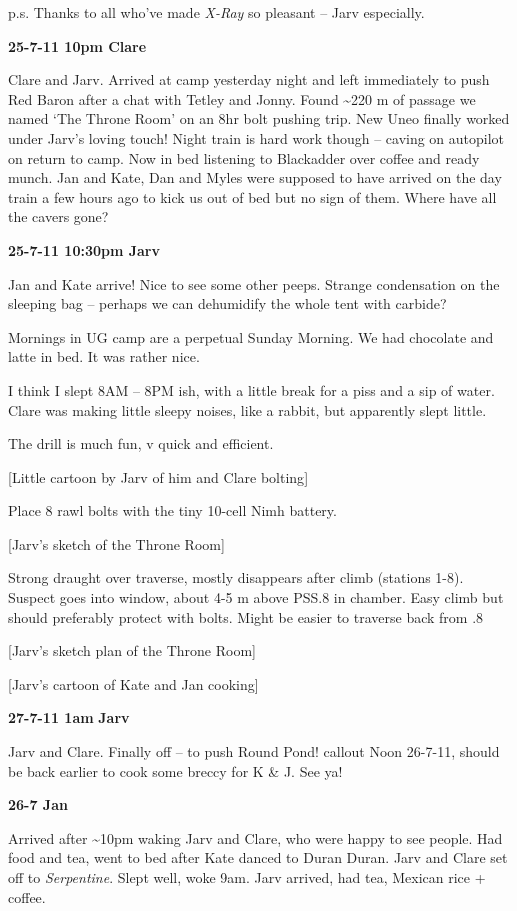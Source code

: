 p.s. Thanks to all who've made \emph{X-Ray} so pleasant -- Jarv
especially.

\textbf{25-7-11 10pm Clare}

Clare and Jarv. Arrived at camp yesterday night and left immediately to
push Red Baron after a chat with Tetley and Jonny. Found
\textasciitilde 220 m of passage we named `The Throne Room' on an 8hr
bolt pushing trip. New Uneo finally worked under Jarv's loving touch!
Night train is hard work though -- caving on autopilot on return to
camp. Now in bed listening to Blackadder over coffee and ready munch.
Jan and Kate, Dan and Myles were supposed to have arrived on the day
train a few hours ago to kick us out of bed but no sign of them. Where
have all the cavers gone?

\textbf{25-7-11 10:30pm Jarv}

Jan and Kate arrive! Nice to see some other peeps. Strange condensation
on the sleeping bag -- perhaps we can dehumidify the whole tent with
carbide?

Mornings in UG camp are a perpetual Sunday Morning. We had chocolate and
latte in bed. It was rather nice.

I think I slept 8AM -- 8PM ish, with a little break for a piss and a sip
of water. Clare was making little sleepy noises, like a rabbit, but
apparently slept little.

The drill is much fun, v quick and efficient.

{[}Little cartoon by Jarv of him and Clare bolting{]}

Place 8 rawl bolts with the tiny 10-cell Nimh battery.

{[}Jarv's sketch of the Throne Room{]}

Strong draught over traverse, mostly disappears after climb (stations
1-8). Suspect goes into window, about 4-5 m above PSS.8 in chamber. Easy
climb but should preferably protect with bolts. Might be easier to
traverse back from .8

{[}Jarv's sketch plan of the Throne Room{]}

{[}Jarv's cartoon of Kate and Jan cooking{]}

\textbf{27-7-11 1am} \textbf{Jarv}

Jarv and Clare. Finally off -- to push Round Pond! callout Noon 26-7-11,
should be back earlier to cook some breccy for K \& J. See ya!

\textbf{26-7 Jan}

Arrived after \textasciitilde 10pm waking Jarv and Clare, who were happy
to see people. Had food and tea, went to bed after Kate danced to Duran
Duran. Jarv and Clare set off to \emph{Serpentine}. Slept well, woke
9am. Jarv arrived, had tea, Mexican rice + coffee.

